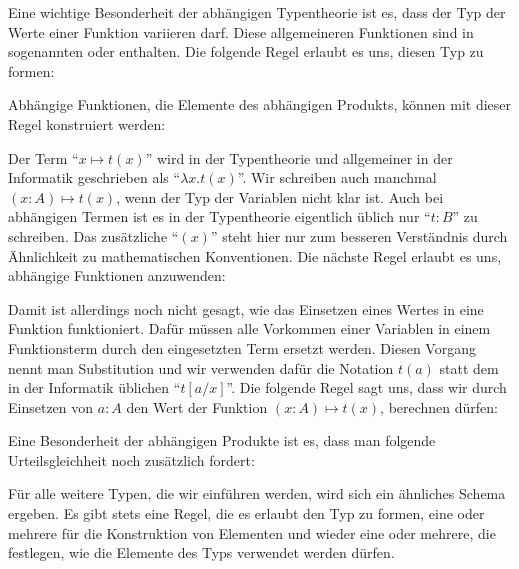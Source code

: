 Eine wichtige Besonderheit der abhängigen Typentheorie ist es, dass der Typ der Werte einer Funktion variieren darf.
Diese allgemeineren Funktionen sind in sogenannten \index{$\prod$} oder  enthalten.
Die folgende Regel erlaubt es uns, diesen Typ zu formen:
\begin{mathpar}
\end{mathpar}
Abhängige Funktionen, die Elemente des abhängigen Produkts, können mit dieser Regel konstruiert werden:
\begin{mathpar}
\end{mathpar}
Der Term ``$x\mapsto t(x)$'' wird in der Typentheorie und allgemeiner in der Informatik geschrieben als ``$\lambda x.t(x)$''.
Wir schreiben auch manchmal $(x:A)\mapsto t(x)$, wenn der Typ der Variablen nicht klar ist.
Auch bei abhängigen Termen ist es in der Typentheorie eigentlich üblich nur ``$t:B$'' zu schreiben.
Das zusätzliche ``$(x)$'' steht hier nur zum besseren Verständnis durch Ähnlichkeit zu mathematischen Konventionen.
Die nächste Regel erlaubt es uns, abhängige Funktionen anzuwenden:
\begin{mathpar}
\end{mathpar}
Damit ist allerdings noch nicht gesagt, wie das Einsetzen eines Wertes in eine Funktion funktioniert.
Dafür müssen alle Vorkommen einer Variablen in einem Funktionsterm durch den eingesetzten Term ersetzt werden.
Diesen Vorgang nennt man Substitution und wir verwenden dafür die Notation $t(a)$ statt dem in der Informatik üblichen ``$t[a/x]$''.
Die folgende Regel sagt uns, dass wir durch Einsetzen von $a:A$ den Wert der Funktion $(x:A)\mapsto t(x)$, berechnen dürfen:
\begin{mathpar}
\end{mathpar}
Eine Besonderheit der abhängigen Produkte ist es, dass man folgende Urteilsgleichheit noch zusätzlich fordert:
\begin{mathpar}
\end{mathpar}
Für alle weitere Typen, die wir einführen werden, wird sich ein ähnliches Schema ergeben.
Es gibt stets eine Regel, die es erlaubt den Typ zu formen, eine oder mehrere für die Konstruktion von Elementen und wieder eine oder mehrere, die festlegen, wie die Elemente des Typs verwendet werden dürfen.

